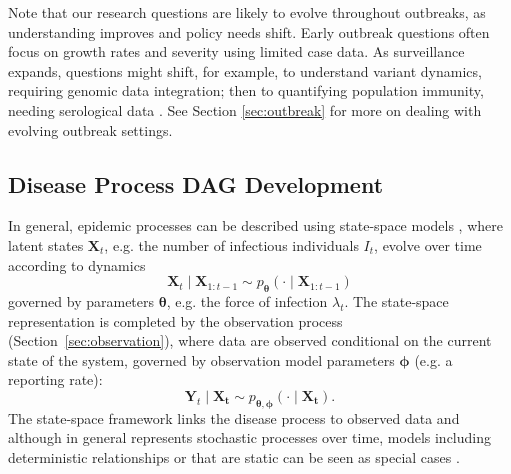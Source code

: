 \documentclass{article}
\begin{document}
Note that our research questions are likely to evolve throughout outbreaks, as understanding improves and policy needs shift. Early outbreak questions often focus on growth rates and severity using limited case data. As surveillance expands, questions might shift, for example, to understand variant dynamics, requiring genomic data integration; then to quantifying population immunity, needing serological data \citep{bhatia2023lessons,shearer2024opportunities}. See Section \ref{sec:outbreak} for more on dealing with evolving outbreak settings.

\subsection{Disease Process DAG Development} \label{sec:process}

In general, epidemic processes can be described using state-space models \citep{birrell2018evidence}, where latent states $\boldsymbol{X}_t$, e.g. the number of infectious individuals $I_t$, evolve over time according to dynamics 
$$
\boldsymbol{X}_{t} \mid \boldsymbol{X}_{1:t-1} \sim p_{\boldsymbol{\theta}}(\cdot \mid \boldsymbol{X}_{1:t-1})
$$
governed by parameters $\boldsymbol{\theta}$, e.g. the force of infection $\lambda_t$. The state-space representation is completed by the observation process (Section~\ref{sec:observation}), where data are observed conditional on the current state of the system, governed by observation model parameters $\boldsymbol{\phi}$ (e.g. a reporting rate):
$$
\boldsymbol{Y}_{t} \mid \boldsymbol{X_t} \sim p_{\boldsymbol{\theta},\boldsymbol{\phi}}(\cdot \mid \boldsymbol{X_t}). 
$$
The state-space framework links the disease process to observed data and although in general represents stochastic processes over time, models including deterministic relationships or that are static can be seen as special cases \citep{birrell2018evidence}. 
\end{document}
